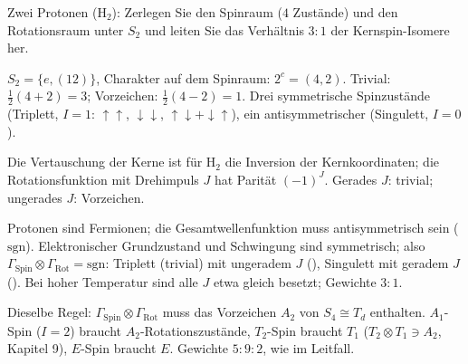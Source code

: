 \begin{aufgabe}
Zwei Protonen ($\mathrm{H_2}$): Zerlegen Sie den Spinraum ($4$ Zustände) und den Rotationsraum unter $S_2$ und leiten Sie das Verhältnis $3 : 1$ der Kernspin-Isomere her.

\loesung
{}
$S_2 = \{e, (12)\}$, Charakter auf dem Spinraum: $2^{c} = (4, 2)$. Trivial: $\frac12(4 + 2) = 3$; Vorzeichen: $\frac12(4 - 2) = 1$. Drei symmetrische Spinzustände (Triplett, $I = 1$: $\uparrow\uparrow$, $\downarrow\downarrow$, $\uparrow\downarrow + \downarrow\uparrow$), ein antisymmetrischer (Singulett, $I = 0$).

Die Vertauschung der Kerne ist für $\mathrm{H_2}$ die Inversion der Kernkoordinaten; die Rotationsfunktion mit Drehimpuls $J$ hat Parität $(-1)^{J}$. Gerades $J$: trivial; ungerades $J$: Vorzeichen.

Protonen sind Fermionen; die Gesamtwellenfunktion muss antisymmetrisch sein ($\mathrm{sgn}$). Elektronischer Grundzustand und Schwingung sind symmetrisch; also $\Gamma_{\mathrm{Spin}}\otimes\Gamma_{\mathrm{Rot}} = \mathrm{sgn}$: Triplett (trivial) mit ungeradem $J$ (), Singulett mit geradem $J$ (). Bei hoher Temperatur sind alle $J$ etwa gleich besetzt; Gewichte $3 : 1$. \checkmark

Dieselbe Regel: $\Gamma_{\mathrm{Spin}}\otimes\Gamma_{\mathrm{Rot}}$ muss das Vorzeichen $A_2$ von $S_4\cong T_d$ enthalten. $A_1$-Spin ($I = 2$) braucht $A_2$-Rotationszustände, $T_2$-Spin braucht $T_1$ ($T_2\otimes T_1\ni A_2$, Kapitel 9), $E$-Spin braucht $E$. Gewichte $5 : 9 : 2$, wie im Leitfall.

\begin{center}
\begin{minipage}{0.88\textwidth}
\end{minipage}
\end{center}
\end{aufgabe}

